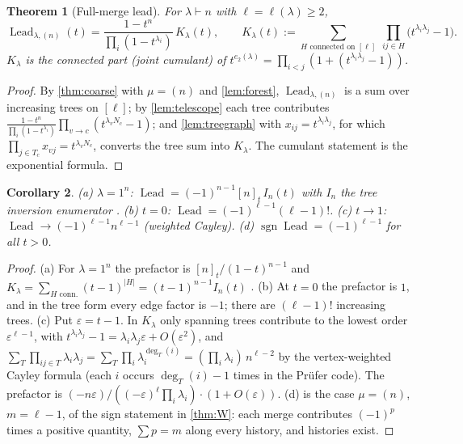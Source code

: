 \documentclass[11pt]{amsart}
\newtheorem{theorem}{Theorem}[section]
\newtheorem{corollary}[theorem]{Corollary}
\theoremstyle{definition}
\theoremstyle{remark}
\numberwithin{equation}{section}
\newcommand{\Lead}{\operatorname{Lead}}
\begin{document}
\begin{theorem}[Full-merge lead]\label{thm:G}
For $\lambda\vdash n$ with $\ell=\ell(\lambda)\ge2$,
\[ \Lead_{\lambda,(n)}(t)=\frac{1-t^n}{\prod_i(1-t^{\lambda_i})}\,K_\lambda(t),\qquad K_\lambda(t):=\sum_{H\text{ connected on }[\ell]}\ \prod_{ij\in H}\bigl(t^{\lambda_i\lambda_j}-1\bigr). \]
$K_\lambda$ is the connected part (joint cumulant) of $t^{e_2(\lambda)}=\prod_{i<j}(1+(t^{\lambda_i\lambda_j}-1))$.
\end{theorem}
\begin{proof}
By \cref{thm:coarse} with $\mu=(n)$ and \cref{lem:forest}, $\Lead_{\lambda,(n)}$ is a sum over increasing trees on $[\ell]$; by \cref{lem:telescope} each tree contributes $\frac{1-t^n}{\prod_i(1-t^{\lambda_i})}\prod_{v\to c}(t^{\lambda_vN_c}-1)$; and \cref{lem:treegraph} with $x_{ij}=t^{\lambda_i\lambda_j}$, for which $\prod_{j\in T_c}x_{vj}=t^{\lambda_vN_c}$, converts the tree sum into $K_\lambda$. The cumulant statement is the exponential formula.
\end{proof}
\begin{corollary}\label{cor:G}
(a) $\lambda=1^n$: $\Lead=(-1)^{n-1}[n]_t\,I_n(t)$ with $I_n$ the tree inversion enumerator \cite{MallowsRiordan68}. (b) $t=0$: $\Lead=(-1)^{\ell-1}(\ell-1)!$. (c) $t\to1$: $\Lead\to(-1)^{\ell-1}n^{\ell-1}$ (weighted Cayley). (d) $\operatorname{sgn}\Lead=(-1)^{\ell-1}$ for all $t>0$.
\end{corollary}
\begin{proof}
(a) For $\lambda=1^n$ the prefactor is $[n]_t/(1-t)^{n-1}$ and $K_\lambda=\sum_{H\text{ conn.}}(t-1)^{|H|}=(t-1)^{n-1}I_n(t)$ \cite{MallowsRiordan68}. (b) At $t=0$ the prefactor is $1$, and in the tree form every edge factor is $-1$; there are $(\ell-1)!$ increasing trees. (c) Put $\varepsilon=t-1$. In $K_\lambda$ only spanning trees contribute to the lowest order $\varepsilon^{\ell-1}$, with $t^{\lambda_i\lambda_j}-1=\lambda_i\lambda_j\varepsilon+O(\varepsilon^2)$, and $\sum_T\prod_{ij\in T}\lambda_i\lambda_j=\sum_T\prod_i\lambda_i^{\deg_T(i)}=(\prod_i\lambda_i)\,n^{\ell-2}$ by the vertex-weighted Cayley formula (each $i$ occurs $\deg_T(i)-1$ times in the Pr\"ufer code). The prefactor is $(-n\varepsilon)/((-\varepsilon)^\ell\prod_i\lambda_i)\cdot(1+O(\varepsilon))$. (d) is the case $\mu=(n)$, $m=\ell-1$, of the sign statement in \cref{thm:W}: each merge contributes $(-1)^p$ times a positive quantity, $\sum p=m$ along every history, and histories exist.
\end{proof}
\end{document}
